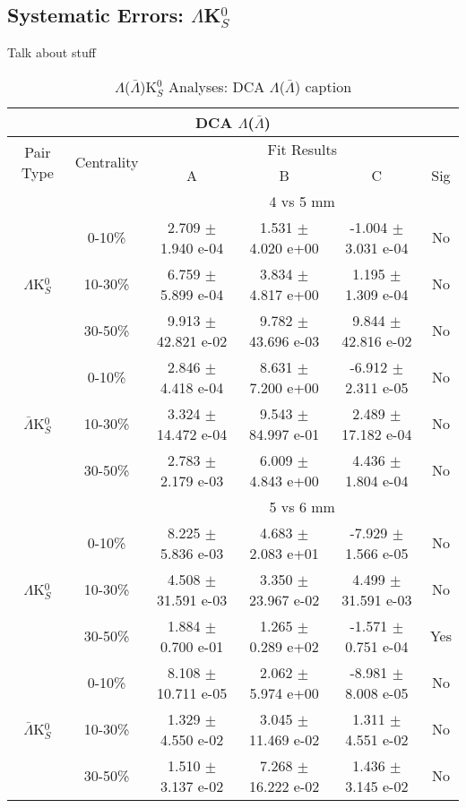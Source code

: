 \documentclass[../AnalysisNoteJBuxton.tex]{subfiles}
\begin{document}
\subsection{Systematic Errors: \texorpdfstring{$\Lambda$K$^{0}_{S}$}{TEXT}}
\label{SysErrsLamK0}

Talk about stuff

\begin{table}
 \centering
 \begin{tabular}{|c|c|c|c|c|c|}
  \multicolumn{6}{c}{DCA $\Lambda$($\bar{\Lambda}$)} \\
  \hline
  \multirow{2}{*}{Pair Type} & \multirow{2}{*}{Centrality} & \multicolumn{4}{c|}{Fit Results} \\
  \cline{3-6}
   & & A & B & C & Sig \\  
  \hline
  \multicolumn{2}{|c}{} & \multicolumn{4}{c|}{4 vs 5 mm} \\  
  \hline  
  \multirow{3}{*}{$\Lambda$K$^{0}_{S}$}
   &  0-10\% & 2.709 $\pm$ 1.940 e-04 & 1.531 $\pm$ 4.020 e+00 & -1.004 $\pm$ 3.031 e-04 & No \\
   & 10-30\% & 6.759 $\pm$ 5.899 e-04 & 3.834 $\pm$ 4.817 e+00 & 1.195 $\pm$ 1.309 e-04 & No \\
   & 30-50\% & 9.913 $\pm$ 42.821 e-02 & 9.782 $\pm$ 43.696 e-03 & 9.844 $\pm$ 42.816 e-02 & No \\
  \hline
  \multirow{3}{*}{$\bar{\Lambda}$K$^{0}_{S}$}  
   &  0-10\% & 2.846 $\pm$ 4.418 e-04 & 8.631 $\pm$ 7.200 e+00 & -6.912 $\pm$ 2.311 e-05 & No \\
   & 10-30\% & 3.324 $\pm$ 14.472 e-04 & 9.543 $\pm$ 84.997 e-01 & 2.489 $\pm$ 17.182 e-04 & No \\
   & 30-50\% & 2.783 $\pm$ 2.179 e-03 & 6.009 $\pm$ 4.843 e+00 & 4.436 $\pm$ 1.804 e-04 & No \\
  \hline 
  \multicolumn{2}{|c}{} & \multicolumn{4}{c|}{5 vs 6 mm} \\
  \hline  
  \multirow{3}{*}{$\Lambda$K$^{0}_{S}$}   
   &  0-10\% & 8.225 $\pm$ 5.836 e-03 & 4.683 $\pm$ 2.083 e+01 & -7.929 $\pm$ 1.566 e-05 & No \\
   & 10-30\% & 4.508 $\pm$ 31.591 e-03 & 3.350 $\pm$ 23.967 e-02 & 4.499 $\pm$ 31.591 e-03 & No \\
   & 30-50\% & 1.884 $\pm$ 0.700 e-01 & 1.265 $\pm$ 0.289 e+02 & -1.571 $\pm$ 0.751 e-04 & Yes \\
  \hline  
  \multirow{3}{*}{$\bar{\Lambda}$K$^{0}_{S}$}
   &  0-10\% & 8.108 $\pm$ 10.711 e-05 & 2.062 $\pm$ 5.974 e+00 & -8.981 $\pm$ 8.008 e-05 & No \\
   & 10-30\% & 1.329 $\pm$ 4.550 e-02 & 3.045 $\pm$ 11.469 e-02 & 1.311 $\pm$ 4.551 e-02 & No \\
   & 30-50\% & 1.510 $\pm$ 3.137 e-02 & 7.268 $\pm$ 16.222 e-02 & 1.436 $\pm$ 3.145 e-02 & No \\
  \hline
 \end{tabular}
 \caption{$\Lambda$($\bar{\Lambda}$)K$^{0}_{S}$ Analyses: DCA $\Lambda$($\bar{\Lambda}$) caption}
 \label{tab:LamDcaLamK0Full}
\end{table}
\end{document}
